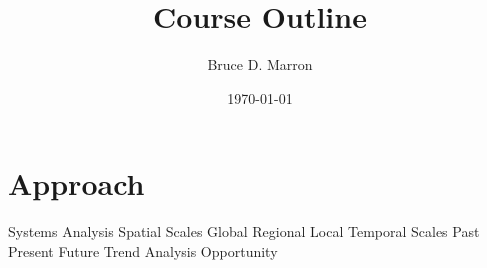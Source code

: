 \documentclass[12pt, letterpaper]{article}
\title{\vspace{-15mm}\fontsize{14pt}{10pt}
                    \selectfont \textbf{Course Outline}   %
                    \vspace{-7mm}
      }
\author{
     \normalsize Bruce D. Marron \\                     %
     \vspace{-5mm}
}
\date{\normalsize \today}
\begin{document}
\begin{singlespacing}
\maketitle                                      %
\end{singlespacing}
\thispagestyle{fancy}                           %

\section{Approach}
\begin{outline}[enumerate]
\1 Systems Analysis 
\2 Spatial Scales
\3 Global
\3 Regional
\3 Local
\2 Temporal Scales
\3 Past
\3 Present
\3 Future
\2 Trend Analysis
\2 Opportunity
\end{outline}
\end{document}
